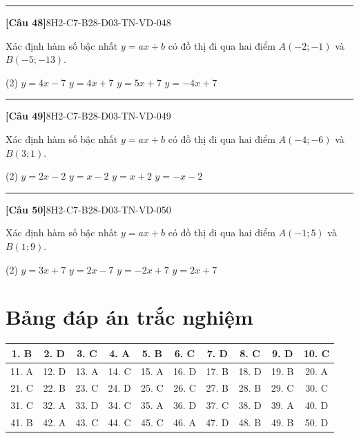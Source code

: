\documentclass[12pt,a4paper]{article}
\newif\ifloigiai
\newenvironment{cauhoi}[2]{%
  \par\medskip\noindent\rule{\textwidth}{0.4pt}\par\nopagebreak
  \noindent\textbf{[#1]}\hfill{\scriptsize\ttfamily #2}\par\nopagebreak\smallskip}{\par}
\newcommand{\dapan}[1]{\ifloigiai\par\smallskip\noindent\textit{Đáp án:} \textbf{#1}\par\fi}
\begin{document}
\begin{cauhoi}{Câu 48}{8H2-C7-B28-D03-TN-VD-048}
Xác định hàm số bậc nhất $y=ax+b$ có đồ thị đi qua hai điểm $A(-2;-1)$ và $B(-5;-13)$.
\begin{tasks}(2)
\task $y=4x-7$
\task $y=4x+7$
\task $y=5x+7$
\task $y=-4x+7$
\end{tasks}
\dapan{B}
\end{cauhoi}
\begin{cauhoi}{Câu 49}{8H2-C7-B28-D03-TN-VD-049}
Xác định hàm số bậc nhất $y=ax+b$ có đồ thị đi qua hai điểm $A(-4;-6)$ và $B(3;1)$.
\begin{tasks}(2)
\task $y=2x-2$
\task $y=x-2$
\task $y=x+2$
\task $y=-x-2$
\end{tasks}
\dapan{B}
\end{cauhoi}
\begin{cauhoi}{Câu 50}{8H2-C7-B28-D03-TN-VD-050}
Xác định hàm số bậc nhất $y=ax+b$ có đồ thị đi qua hai điểm $A(-1;5)$ và $B(1;9)$.
\begin{tasks}(2)
\task $y=3x+7$
\task $y=2x-7$
\task $y=-2x+7$
\task $y=2x+7$
\end{tasks}
\dapan{D}
\end{cauhoi}
\clearpage\section*{Bảng đáp án trắc nghiệm}
\begin{center}\begin{tabular}{|c|c|c|c|c|c|c|c|c|c|}
\hline
1. B & 2. D & 3. C & 4. A & 5. B & 6. C & 7. D & 8. C & 9. D & 10. C\\\hline
11. A & 12. D & 13. A & 14. C & 15. A & 16. D & 17. B & 18. D & 19. B & 20. A\\\hline
21. C & 22. B & 23. C & 24. D & 25. C & 26. C & 27. B & 28. B & 29. C & 30. C\\\hline
31. C & 32. A & 33. D & 34. C & 35. A & 36. D & 37. C & 38. D & 39. A & 40. D\\\hline
41. B & 42. A & 43. C & 44. C & 45. C & 46. A & 47. D & 48. B & 49. B & 50. D\\\hline
\end{tabular}\end{center}
\end{document}
